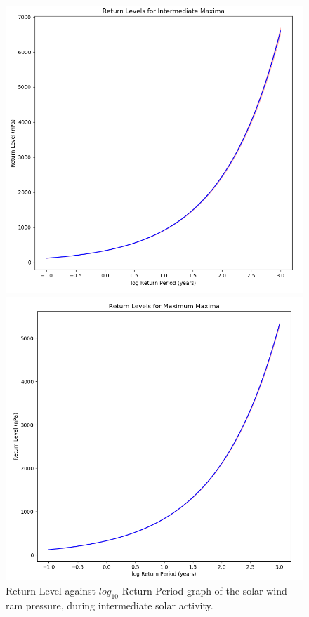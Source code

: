\documentclass[11pt]{article}
\begin{document}
        \begin{figure}[t!]
            \begin{minipage}{0.48\textwidth}
                \centering
                \includegraphics[width=\textwidth]{fig_method/PintmaxReturn.png}
                \caption{Return Level against $log_{10}$ Return Period graph of the solar wind ram pressure, during intermediate solar activity.}
                \label{fig:PintmaxReturn}
            \end{minipage}
            \hfill
            \begin{minipage}{0.48\textwidth}
                \centering
                \includegraphics[width=\textwidth]{fig_method/PmaxmaxReturn.png}

\end{minipage}
\end{figure}
\end{document}
